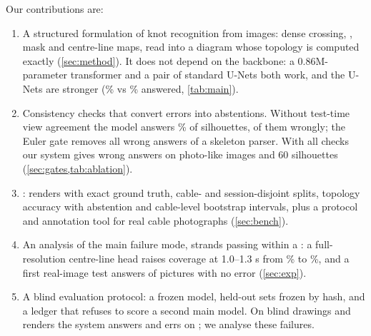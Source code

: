 \noindent Our contributions are:
\begin{enumerate}
\item A structured formulation of knot recognition from images: dense crossing,
  \ou{}, mask and centre-line maps, read into a diagram whose topology is computed
  exactly (\cref{sec:method}). It does not depend on the backbone: a 0.86M-parameter
  transformer and a pair of standard U-Nets both work, and the U-Nets are stronger
  (\UPCov\% vs \VthreeCov\% answered, \cref{tab:main}).
\item Consistency checks that convert errors into abstentions. Without test-time view
  agreement the model answers \NoTTASilCov\% of silhouettes, \NoTTASilWrong{} of them
  wrongly; the Euler gate removes all \BaseWrongNoGate{} wrong answers of a skeleton
  parser. With all checks our system gives \VthreeWrong{} wrong answers on
  \VthreeImages{} photo-like images and 60 silhouettes (\cref{sec:gates,tab:ablation}).
\item \bench{}: renders with exact ground truth, cable- and session-disjoint splits,
  topology accuracy with abstention and cable-level bootstrap intervals, plus a
  protocol and annotation tool for real cable photographs (\cref{sec:bench}).
\item An analysis of the main failure mode, strands passing within a \cw{}: a
  full-resolution centre-line head raises coverage at 1.0--1.3 \cw s from
  \CloseMidVone\% to \CloseMidVthree\%, and a first real-image test answers
  \RealAns{} of \RealN{} pictures with no error (\cref{sec:exp}).
\item A blind evaluation protocol: a frozen model, held-out sets frozen by hash, and a ledger
  that refuses to score a second main model. On \BlindN{} blind drawings and renders the
  system answers \BlindAns{} and errs on \BlindWrong{}; we analyse these failures.
\end{enumerate}
